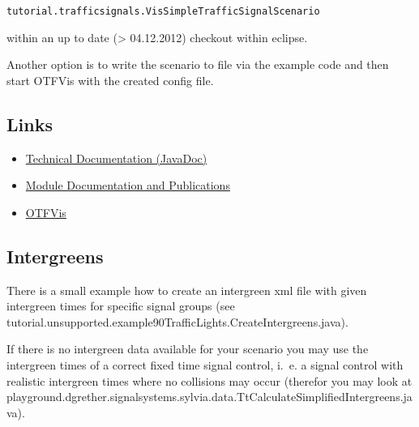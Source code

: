 \texttt{\nolinebreak  tutorial.trafficsignals.VisSimpleTrafficSignalScenario }

within an up to date (> 04.12.2012) checkout within eclipse.

Another option is to write the scenario to file via the example code and then start OTFVis with the created config file.

\subsection{Links}
\begin{itemize}
	\item \href{http://ci.matsim.org:8080/job/MATSim_M2/javadoc/org/matsim/signalsystems/package-summary.html}{Technical Documentation (JavaDoc)}
	\item \href{http://matsim.org/node/384}{Module Documentation and Publications}
	\item \href{http://matsim.org/node/693}{OTFVis}
\end{itemize}

\subsection{Intergreens}

There is a small example how to create an intergreen xml file with given
intergreen times for specific signal groups (see
tutorial.unsupported.example90TrafficLights.CreateIntergreens.java).

If there is no intergreen data available for your scenario you may use the
intergreen times of a correct fixed time signal control, i.~e. a signal control
with realistic intergreen times where no collisions may occur (therefor you may
look at playground.dgrether.signalsystems.sylvia.data.TtCalculateSimplifiedIntergreens.java).


\texttt{\nolinebreak  }




\texttt{\nolinebreak  }
